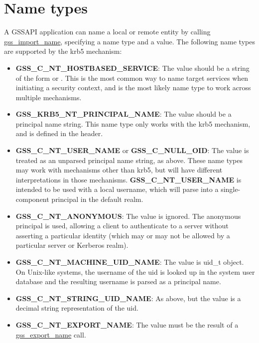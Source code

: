 \documentclass[letterpaper,10pt,english]{sphinxmanual}
\begin{document}
\section{Name types}
\label{appdev/gssapi:name-types}
A GSSAPI application can name a local or remote entity by calling
\href{http://tools.ietf.org/html/rfc2744.html\#section-5.16}{gss\_import\_name}, specifying a name type and a value.  The following
name types are supported by the krb5 mechanism:
\begin{itemize}
\item {} 
\textbf{GSS\_C\_NT\_HOSTBASED\_SERVICE}: The value should be a string of the
form  or .  This is the most common
way to name target services when initiating a security context, and
is the most likely name type to work across multiple mechanisms.

\item {} 
\textbf{GSS\_KRB5\_NT\_PRINCIPAL\_NAME}: The value should be a principal name
string.  This name type only works with the krb5 mechanism, and is
defined in the  header.

\item {} 
\textbf{GSS\_C\_NT\_USER\_NAME} or \textbf{GSS\_C\_NULL\_OID}: The value is treated
as an unparsed principal name string, as above.  These name types
may work with mechanisms other than krb5, but will have different
interpretations in those mechanisms.  \textbf{GSS\_C\_NT\_USER\_NAME} is
intended to be used with a local username, which will parse into a
single-component principal in the default realm.

\item {} 
\textbf{GSS\_C\_NT\_ANONYMOUS}: The value is ignored.  The anonymous
principal is used, allowing a client to authenticate to a server
without asserting a particular identity (which may or may not be
allowed by a particular server or Kerberos realm).

\item {} 
\textbf{GSS\_C\_NT\_MACHINE\_UID\_NAME}: The value is uid\_t object.  On
Unix-like systems, the username of the uid is looked up in the
system user database and the resulting username is parsed as a
principal name.

\item {} 
\textbf{GSS\_C\_NT\_STRING\_UID\_NAME}: As above, but the value is a decimal
string representation of the uid.

\item {} 
\textbf{GSS\_C\_NT\_EXPORT\_NAME}: The value must be the result of a
\href{http://tools.ietf.org/html/rfc2744.html\#section-5.13}{gss\_export\_name} call.

\end{itemize}
\end{document}
